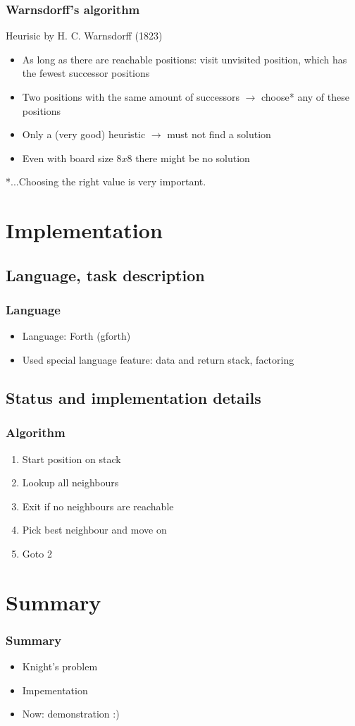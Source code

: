 \documentclass{beamer}
\begin{document}
\begin{frame}
\frametitle{Warnsdorff's algorithm}
Heurisic by H. C. Warnsdorff (1823)\par
\begin{itemize}
	\item As long as there are reachable positions: visit unvisited position,
	which has the fewest successor positions
	\item Two positions with the same amount of successors $\rightarrow$
	choose* any of these positions
	\item Only a (very good) heuristic $\rightarrow$ must not find a solution
	\item Even with board size $8x8$ there might be no solution
\end{itemize}
*...Choosing the right value is very important.
\end{frame}

\section{Implementation}
\subsection{Language, task description}
\begin{frame}
\frametitle{Language}
\begin{itemize}
	\item Language: Forth (gforth)
	\item Used special language feature: data and return stack, factoring
\end{itemize}
\end{frame}

\subsection{Status and implementation details}
\begin{frame}
\frametitle{Algorithm}
\begin{enumerate}
	\item Start position on stack
	\item Lookup all neighbours
	\item Exit if no neighbours are reachable
	\item Pick best neighbour and move on
	\item Goto 2
\end{enumerate}
\end{frame}

\section{Summary}
\begin{frame}
\frametitle{Summary}
\begin{itemize}
	\item Knight's problem
	\item Impementation
	\item Now: demonstration :)
\end{itemize}
\end{frame}
\end{document}
